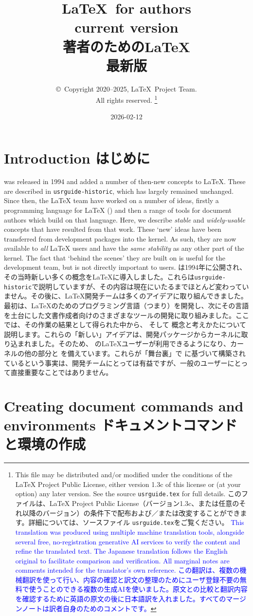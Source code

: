 \documentclass{ltxguide}
\title{\LaTeX\ for authors\\ current version \\
著者のための\LaTeX\\
最新版}
\author{\copyright~Copyright 2020--2025, \LaTeX\ Project Team.\\
   All rights reserved.%
   \footnote{This file may be distributed and/or modified under the
     conditions of the \LaTeX{} Project Public License, either version 1.3c
     of this license or (at your option) any later version. See the source
    \texttt{usrguide.tex} for full details.  \jpnewline
    このファイルは、\LaTeX{} Project Public License（バージョン1.3c、または任意のそれ以降のバージョン）の条件下で配布および／または改変することができます。詳細については、ソースファイル \texttt{usrguide.tex}をご覧ください。  \jpnewline \textcolor{blue}{\fbox{AI Disclosure}
This translation was produced using multiple machine translation tools, alongside several free, no-registration generative AI services to verify the content and refine the translated text. The Japanese translation follows the English original to facilitate comparison and verification. All marginal notes are comments intended for the translator's own reference. この翻訳は、複数の機械翻訳を使って行い、内容の確認と訳文の整理のためにユーザ登録不要の無料で使うことのできる複数の生成AIを使いました。原文との比較と翻訳内容を確認するために英語の原文の後に日本語訳を入れました。すべてのマージンノートは訳者自身のためのコメントです。}}%
}
\date{2026-02-12}
\newcommand\jpnewline{\vspace{3pt}\newline}
\DeclareRobustCommand{\jpemph}[1]{%
  \underLine{#1}%
}
\begin{document}
\maketitle

\tableofcontents

\section{Introduction
はじめに}

\LaTeXe{} was released in 1994 and added a number of then-new concepts to
\LaTeX{}. These are described in \texttt{usrguide-historic}, which has largely remained
unchanged. Since then, the \LaTeX{} team have worked on a number of ideas,
firstly a programming language for \LaTeX{} () and then a range of
tools for document authors which build on that language. Here, we describe
\emph{stable} and \emph{widely-usable} concepts that have resulted from that
work. These `new' ideas have been transferred from development packages
into the \LaTeXe{} kernel. As such, they are now available to \emph{all}
\LaTeX{} users and have the \emph{same stability} as any other part of the
kernel. The fact that `behind the scenes' they are built on 
is useful for the development team, but is not directly important to users.
\jpnewline
\LaTeXe{}は1994年に公開され、その当時新しい多くの概念を\LaTeX{}に導入しました。これらは\texttt{usrguide-historic}で説明していますが、その内容は現在にいたるまでほとんど変わっていません。その後に、\LaTeX{}開発チームは多くのアイデアに取り組んできました。最初は、\LaTeX{}のためのプログラミング言語（つまり）を開発し、次にその言語を土台にした文書作成者向けのさまざまなツールの開発に取り組みました。ここでは、その作業の結果として得られた中から、\jpemph{安定していて}そして\jpemph{幅広く利用できる}概念と考えかたについて説明します。これらの「新しい」アイデアは、開発パッケージから\LaTeXe{}カーネルに取り込まれました。そのため、\jpemph{すべて}の\LaTeX{}ユーザーが利用できるようになり、カーネルの他の部分と\jpemph{同じ安定性}を備えています。これらが「舞台裏」で に基づいて構築されているという事実は、開発チームにとっては有益ですが、一般のユーザーにとって直接重要なことではありません。

\section{Creating document commands and environments
ドキュメントコマンドと環境の作成}
\end{document}
